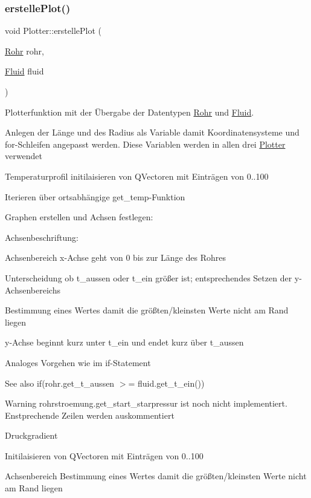 \subsubsection{\texorpdfstring{erstelle\+Plot()}{erstellePlot()}}
{\footnotesize\ttfamily void Plotter\+::erstelle\+Plot (\begin{DoxyParamCaption}\item[{\hyperlink{class_rohr}{Rohr}}]{rohr,  }\item[{\hyperlink{class_fluid}{Fluid}}]{fluid }\end{DoxyParamCaption})}



Plotterfunktion mit der Übergabe der Datentypen \hyperlink{class_rohr}{Rohr} und \hyperlink{class_fluid}{Fluid}. 

Anlegen der Länge und des Radius als Variable damit Koordinatensysteme und for-\/\+Schleifen angepasst werden. Diese Variablen werden in allen drei \hyperlink{class_plotter}{Plotter} verwendet

Temperaturprofil initilaisieren von Q\+Vectoren mit Einträgen von 0..100

Iterieren über ortsabhängige get\+\_\+temp-\/\+Funktion

Graphen erstellen und Achsen festlegen\+:

Achsenbeschriftung\+:

Achsenbereich x-\/\+Achse geht von 0 bis zur Länge des Rohres

Unterscheidung ob t\+\_\+aussen oder t\+\_\+ein größer ist; entsprechendes Setzen der y-\/\+Achsenbereichs

Bestimmung eines Wertes damit die größten/kleinsten Werte nicht am Rand liegen

y-\/\+Achse beginnt kurz unter t\+\_\+ein und endet kurz über t\+\_\+aussen

Analoges Vorgehen wie im if-\/\+Statement \begin{DoxySeeAlso}{See also}
if(rohr.\+get\+\_\+t\+\_\+aussen $>$= fluid.\+get\+\_\+t\+\_\+ein())
\end{DoxySeeAlso}
\begin{DoxyWarning}{Warning}
rohrstroemung.\+get\+\_\+start\+\_\+starpressur ist noch nicht implementiert. Enstprechende Zeilen werden auskommentiert
\end{DoxyWarning}
Druckgradient

Initilaisieren von Q\+Vectoren mit Einträgen von 0..100

Achsenbereich Bestimmung eines Wertes damit die größten/kleinsten Werte nicht am Rand liegen


